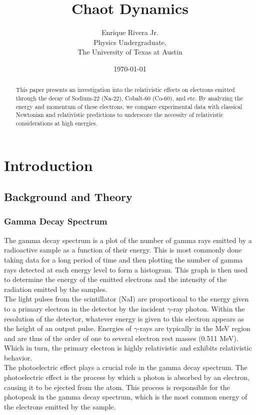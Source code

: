 \documentclass[12pt]{article}
\title{Chaot Dynamics}
\author{Enrique Rivera Jr. \\
        Physics Undergraduate, \\ 
        The University of Texas at Austin}
\date{\today}
\begin{document}
\maketitle

\begin{abstract}
        This paper presents an investigation into the relativistic effects on electrons emitted through 
        the decay of Sodium-22 (Na-22), Cobalt-60 (Co-60), and etc. By analyzing the energy and momentum of these electrons, 
        we compare experimental data with classical Newtonian and relativistic predictions to underscore 
        the necessity of relativistic considerations at high energies.
\end{abstract}

\section{Introduction}
    \subsection{Background and Theory}

        \subsubsection{Gamma Decay Spectrum} 
        The gamma decay spectrum is a plot of the number of gamma rays emitted by a radioactive sample as a function of their energy.
        This is most commonly done taking data for a long period of time and then plotting the number of gamma rays detected at each energy level to form a histogram.
        This graph is then used to determine the energy of the emitted electrons and the intensity of the radiation emitted by the samples.
        \\
        
       The light pulses from the scintillator (NaI) are proportional to the 
        energy given to a primary electron in the detector by the incident $\gamma$-ray photon. Within the resolution of the detector, 
        whatever energy is given to this electron appears as the height of an output pulse. Energies of $\gamma$-rays are typically in 
        the MeV region and are thus of the order of one to several electron rest masses (0.511 MeV). Which in turn, the primary electron 
        is highly relativistic and exhibits relativistic behavior.
        \\ 

        The photoelectric effect plays a crucial role in the gamma decay spectrum. The photoelectric effect is the process by 
        which a photon is absorbed by an electron, causing it to be ejected from the atom. This process is responsible for the
        photopeak in the gamma decay spectrum, which is the most common energy of the electrons emitted by the sample. 
        \\
\end{document}
